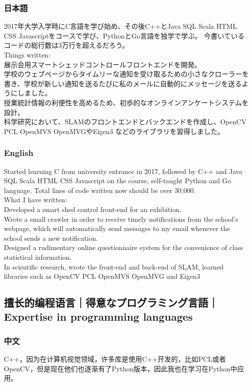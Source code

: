 \documentclass[lang=cn,11pt,a4paper]{elegantpaper}
\begin{document}
\subsubsection{日本語}
2017年大学入学時にC言語を学び始め、その後C++とJava SQL Scala HTML CSS Javascriptをコースで学び、PythonとGo言語を独学で学ぶ。 今書いているコードの総行数は3万行を超えるだろう。 \\
Things written: \\
展示会用スマートシェッドコントロールフロントエンドを開発。 \\
学校のウェブページからタイムリーな通知を受け取るための小さなクローラーを書き、学校が新しい通知を送るたびに私のメールに自動的にメッセージを送るようにしました。 \\
授業統計情報の利便性を高めるため、初歩的なオンラインアンケートシステムを設計。 \\
科学研究において、SLAMのフロントエンドとバックエンドを作成し、OpenCV PCL OpenMVS OpenMVGやEigen3 などのライブラリを習得しました。
\subsubsection{English}
Started learning C from university entrance in 2017, followed by C++ and Java SQL Scala HTML CSS Javascript on the course, self-taught Python and Go language. Total lines of code written now should be over 30,000. \\
What I have written: \\
Developed a smart shed control front-end for an exhibition. \\
Wrote a small crawler in order to receive timely notifications from the school's webpage, which will automatically send messages to my email whenever the school sends a new notification. \\
Designed a rudimentary online questionnaire system for the convenience of class statistical information. \\
In scientific research, wrote the front-end and back-end of SLAM, learned libraries such as OpenCV PCL OpenMVS OpenMVG and Eigen3 \\

\subsection{擅长的编程语言｜得意なプログラミング言語｜Expertise in programming languages}
\subsubsection{中文}
C++，因为在计算机视觉领域，许多库是使用C++开发的，比如PCL或者OpenCV，但是现在他们也逐渐有了Python版本，因此我也在学习在Python中应用。
\end{document}
